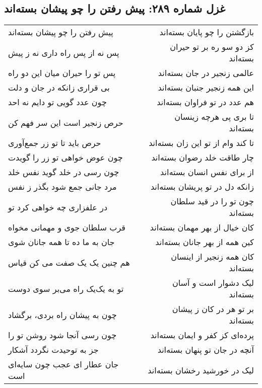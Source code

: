 \begin{center}
\section*{غزل شماره ۲۸۹: پیش رفتن را چو پیشان بسته‌اند}
\label{sec:289}
\begin{longtable}{l p{0.5cm} r}
پیش رفتن را چو پیشان بسته‌اند
&&
بازگشتن را چو پایان بسته‌اند
\\
پس نه از پس راه داری نه ز پیش
&&
کز دو سو ره بر تو حیران بسته‌اند
\\
پس تو را حیران میان این دو راه
&&
عالمی زنجیر در جان بسته‌اند
\\
بی قراری زانکه در جان و دلت
&&
این همه زنجیر جنبان بسته‌اند
\\
چون عدد گویی تو دایم نه احد
&&
هم عدد در تو فراوان بسته‌اند
\\
حرص زنجیر است این سر فهم کن
&&
تا بری پی هرچه زینسان بسته‌اند
\\
حرص باید تا تو زر جمع‌آوری
&&
تا کند وام از تو این زان بسته‌اند
\\
چون عوض خواهی تو زر را گویدت
&&
چار طاقت خلد رضوان بسته‌اند
\\
چون رسی در خلد گوید نفس خلد
&&
از برای نفس انسان بسته‌اند
\\
مرد جانی جمع شود بگذر ز نفس
&&
زانکه دل در تو پریشان بسته‌اند
\\
در علفزاری چه خواهی کرد تو
&&
چون تو را در قید سلطان بسته‌اند
\\
قرب سلطان جوی و مهمانی مخواه
&&
کان خیال از بهر مهمان بسته‌اند
\\
جان به ما ده تا همه جانان شوی
&&
کین همه از بهر جانان بسته‌اند
\\
هم چنین یک یک صفت می کن قیاس
&&
کان همه زنجیر از اینسان بسته‌اند
\\
تو به یک‌یک راه می‌بر سوی دوست
&&
لیک دشوار است و آسان بسته‌اند
\\
چون به پیشان راه بردی، برگشاد
&&
بر تو هر در کان ز پیشان بسته‌اند
\\
چون رسی آنجا شود روشن تو را
&&
پرده‌ای کز کفر و ایمان بسته‌اند
\\
جز به توحیدت نگردد آشکار
&&
آنچه در جان تو پنهان بسته‌اند
\\
جان عطار ای عجب چون سایه‌ای است
&&
لیک در خورشید رخشان بسته‌اند
\\
\end{longtable}
\end{center}
